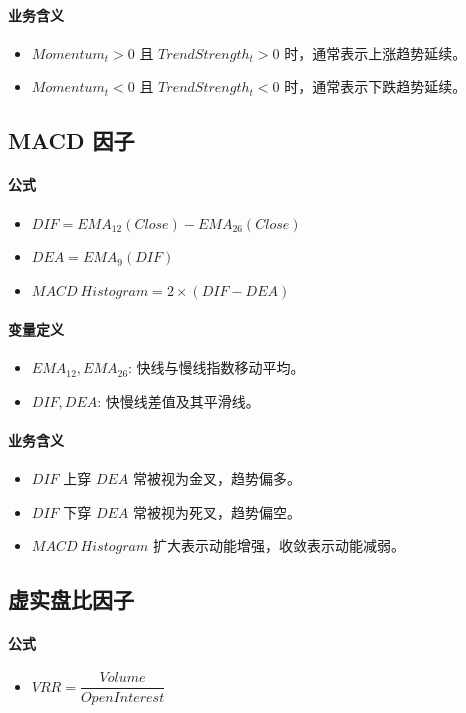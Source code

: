 \documentclass[11pt,a4paper]{ctexart}
\begin{document}
\paragraph{业务含义}
\begin{itemize}
\item $Momentum_t>0$ 且 $TrendStrength_t>0$ 时，通常表示上涨趋势延续。
\item $Momentum_t<0$ 且 $TrendStrength_t<0$ 时，通常表示下跌趋势延续。
\end{itemize}
\subsection{MACD 因子}
\paragraph{公式}
\begin{itemize}
\item $DIF=EMA_{12}(Close)-EMA_{26}(Close)$
\item $DEA=EMA_{9}(DIF)$
\item $MACD\ Histogram=2\times(DIF-DEA)$
\end{itemize}
\paragraph{变量定义}
\begin{itemize}
\item $EMA_{12}, EMA_{26}$: 快线与慢线指数移动平均。
\item $DIF, DEA$: 快慢线差值及其平滑线。
\end{itemize}
\paragraph{业务含义}
\begin{itemize}
\item $DIF$ 上穿 $DEA$ 常被视为金叉，趋势偏多。
\item $DIF$ 下穿 $DEA$ 常被视为死叉，趋势偏空。
\item $MACD\ Histogram$ 扩大表示动能增强，收敛表示动能减弱。
\end{itemize}
\subsection{虚实盘比因子}
\paragraph{公式}
\begin{itemize}
\item $VRR=\dfrac{Volume}{OpenInterest}$
\end{itemize}
\end{document}
